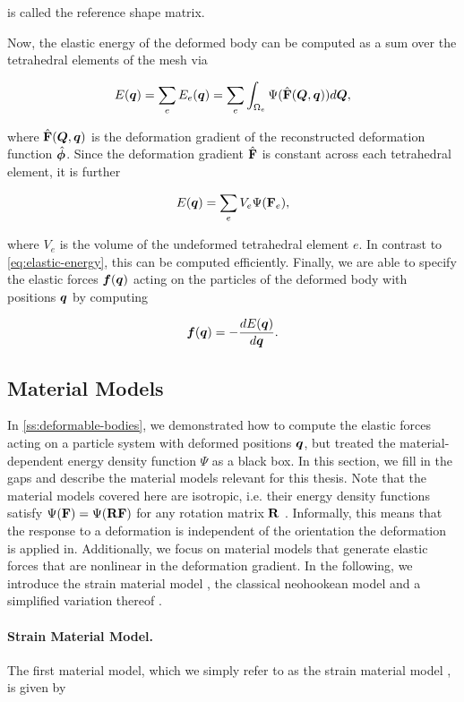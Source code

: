 \noindent is called the reference shape matrix.

Now, the elastic energy of the deformed body can be computed as a sum over the tetrahedral elements of the mesh via

\[
    E(\bm{q}) = \sum_e E_e(\bm{q}) = \sum_e \int_{\Omega_e} \Psi(\hat{\mathbf{F}}(\bm{Q}, \bm{q})) d\bm{Q},
\]

\noindent where $\hat{\mathbf{F}}(\bm{Q}, \bm{q})$ is the deformation gradient of the reconstructed deformation 
function $\hat{\bm{\phi}}$. Since the deformation gradient $\hat{\mathbf{F}}$ is constant across each tetrahedral element, 
it is further

\[
    E(\bm{q}) = \sum_e V_e \Psi(\mathbf{F}_e),
\]

\noindent where $V_e$ is the volume of the undeformed tetrahedral element $e$. In contrast to \autoref{eq:elastic-energy}, this can be computed efficiently. 
Finally, we are able to specify the elastic forces $\bm{f}(\bm{q})$ acting on the particles of the deformed body with positions $\bm{q}$ by computing

\[
    \bm{f}(\bm{q}) = -\frac{dE(\bm{\bm{q}})}{d\bm{q}}.
\]

\subsection{Material Models}\label{ss:material-models}
In \autoref{ss:deformable-bodies}, we demonstrated how to compute the elastic forces acting on a particle system with deformed positions 
$\bm{q}$, but treated the material-dependent energy density function $\Psi$ as a black box. In this section, we fill in the gaps and describe the material
models relevant for this thesis. Note that the material models covered here are isotropic, i.e. their energy density functions satisfy $\Psi(\mathbf{F}) = 
\Psi(\mathbf{R}\mathbf{F})$ for any rotation matrix $\mathbf{R}$ \cite{sifakis2012}. Informally, this means that the response to a deformation is 
independent of the orientation the deformation is applied in. Additionally, we focus on material models that generate elastic forces that are nonlinear 
in the deformation gradient. In the following, we introduce the strain material model \cite{bouaziz2014}, the classical neohookean model and a simplified 
variation thereof \cite{smith2018}.

\paragraph{Strain Material Model.}
The first material model, which we simply refer to as the strain material model \cite{bouaziz2014}, is given by

